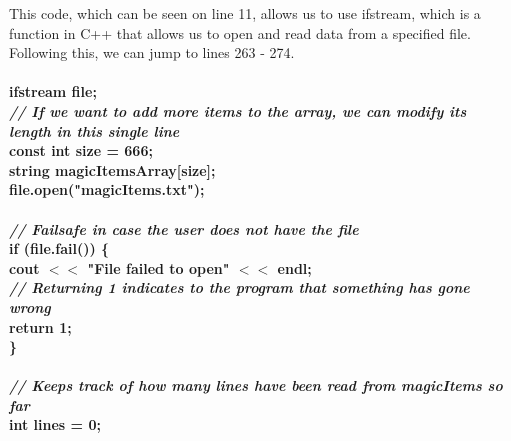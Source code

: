 \documentclass{article}
\begin{document}
This code, which can be seen on line 11, allows us to use ifstream, which is a function in C++ that allows us to open and read data from a specified file. Following this, we can jump to lines 263 - 274.
\\ \textbf{
\\ \indent ifstream file;\\
    \textit{ \indent // If we want to add more items to the array, we can modify its length in this single line\\ }
    \indent const int size = 666;\\
    \indent string magicItemsArray[size];\\
    \indent file.open("magicItems.txt");\\
\\
    \textit{ \indent // Failsafe in case the user does not have the file\\ }
    \indent if (file.fail()) \{\\
       \indent \indent cout $<<$ "File failed to open" $<<$ endl;\\
        \textit{ \indent \indent // Returning 1 indicates to the program that something has gone wrong\\ }
        \indent \indent return 1;\\
    \indent \}\\
\\
    \textit{ \indent // Keeps track of how many lines have been read from magicItems so far\\ }
    \indent int lines = 0;\\ }
\end{document}
